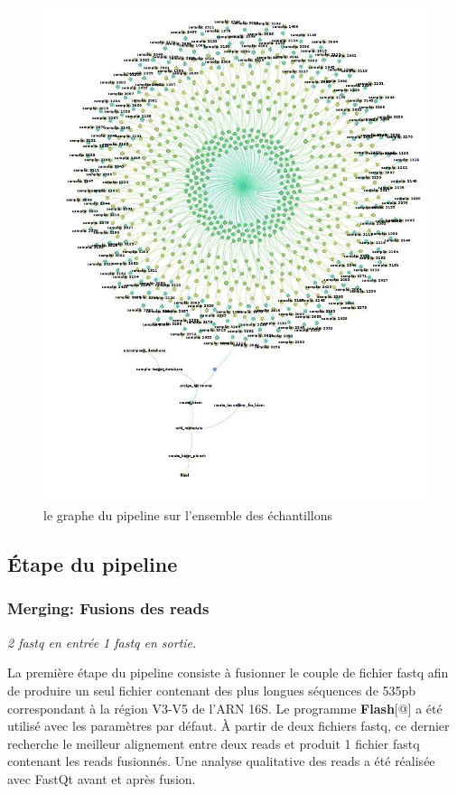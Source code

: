 \documentclass[12pt,a4paper]{article}
\begin{document}
\begin{figure}[ht]
\begin{center}
\includegraphics[scale=0.4]{img/dag.jpg}\hfill
\end{center}
\caption{le graphe du pipeline sur l'ensemble des échantillons}
\label{dag}
\end{figure}

\subsection{Étape du pipeline}
\subsubsection{Merging: Fusions des reads}\begin{center}\emph{ 2 fastq en entrée 1 fastq en sortie. } \end{center}

La première étape du pipeline consiste à fusionner le couple de fichier fastq afin de produire un seul fichier contenant des plus longues séquences de 535pb correspondant à la région V3-V5 de l’ARN 16S.
Le programme \textbf{Flash}[@] a été utilisé avec les paramètres par défaut. À partir de deux fichiers fastq, ce dernier recherche le meilleur alignement entre deux reads et produit 1 fichier fastq contenant les reads fusionnés.
Une analyse qualitative des reads a été réalisée avec FastQt\citep{Beck} avant et après fusion.
\end{document}

